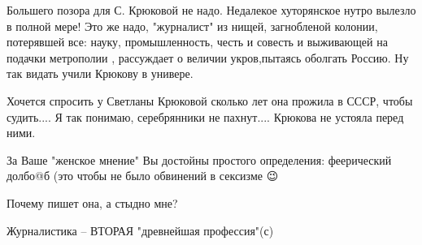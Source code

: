 \begin{itemize}
 

Большего позора для С. Крюковой не надо. Недалекое хуторянское нутро вылезло в
полной мере! Это же надо, "журналист" из нищей, загнобленой колонии, потерявшей
все: науку, промышленность, честь и совесть и выживающей на подачки метрополии
, рассуждает о величии укров,пытаясь оболгать Россию. Ну так видать учили
Крюкову в универе.


 

Хочется спросить у Светланы Крюковой сколько лет она прожила в СССР, чтобы
судить....  Я так понимаю, серебрянники не пахнут.... Крюкова не устояла перед
ними.

 
За Ваше "женское мнение" Вы достойны простого определения: феерический долбо@б (это чтобы не было обвинений в сексизме 😉

 
Почему пишет она, а стыдно мне?

 
Журналистика – ВТОРАЯ "древнейшая профессия"(с) \Smiley[1.0][yellow]

 


\end{itemize}
